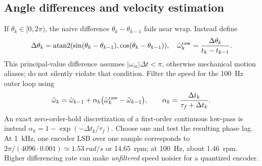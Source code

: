 \documentclass[10pt,letterpaper]{article}
\begin{document}
\subsection{Angle differences and velocity estimation}
If $\theta_k\in[0,2\pi)$, the naive difference $\theta_k-\theta_{k-1}$ fails near wrap. Instead define
\begin{equation}\label{eq:wrapvel}
\Delta\theta_k=\operatorname{atan2}(\sin(\theta_k-\theta_{k-1}),\cos(\theta_k-\theta_{k-1})),\quad
\hat\omega_k^{\rm raw}=\frac{\Delta\theta_k}{t_k-t_{k-1}}.
\end{equation}
This principal-value difference assumes $|\omega_m|\Delta t<\pi$, otherwise mechanical motion aliases; do not silently violate that condition. Filter the speed for the \SI{100}{Hz} outer loop using
\begin{equation}\label{eq:lpf}
\hat\omega_k=\hat\omega_{k-1}+\alpha_k\bigl(\hat\omega_k^{\rm raw}-\hat\omega_{k-1}\bigr),\qquad
\alpha_k=\frac{\Delta t_k}{\tau_f+\Delta t_k}.
\end{equation}
An exact zero-order-hold discretization of a first-order continuous low-pass is instead $\alpha_k=1-\exp(-\Delta t_k/\tau_f)$. Choose one and test the resulting phase lag. At \SI{1}{kHz}, one encoder LSB over one sample corresponds to $2\pi/(4096\cdot0.001)\simeq\SI{1.53}{rad/s}$ or \SI{14.65}{rpm}; at \SI{100}{Hz}, about \SI{1.46}{rpm}. Higher differencing rate can make \emph{unfiltered} speed noisier for a quantized encoder.
\end{document}

